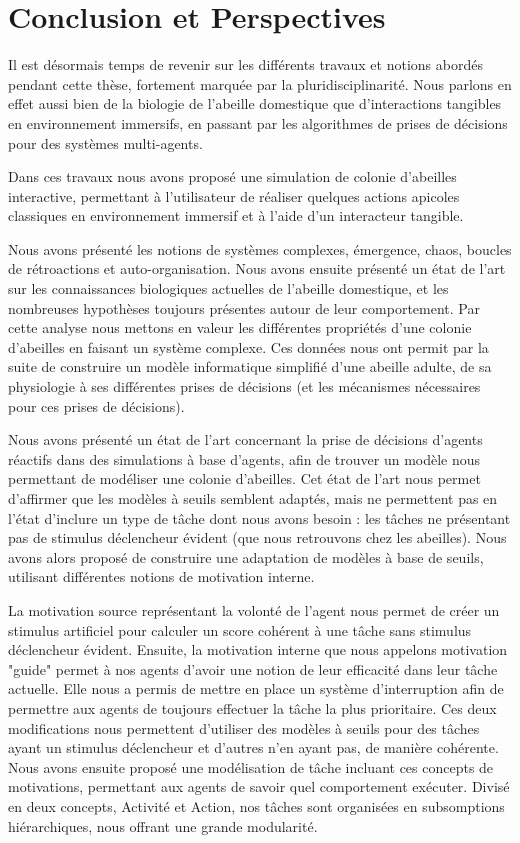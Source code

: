 \chapter*{Conclusion et Perspectives}

Il est désormais temps de revenir sur les différents travaux et notions abordés pendant cette thèse, fortement marquée par la pluridisciplinarité. Nous parlons en effet aussi bien de la biologie de l'abeille domestique que d'interactions tangibles en environnement immersifs, en passant par les algorithmes de prises de décisions pour des systèmes multi-agents.

Dans ces travaux nous avons proposé une simulation de colonie d'abeilles interactive, permettant à l'utilisateur de réaliser quelques actions apicoles classiques en environnement immersif et à l'aide d'un interacteur tangible.

Nous avons présenté les notions de systèmes complexes, émergence, chaos, boucles de rétroactions et auto-organisation. Nous avons ensuite présenté un état de l'art sur les connaissances biologiques actuelles de l'abeille domestique, et les nombreuses hypothèses toujours présentes autour de leur comportement. Par cette analyse nous mettons en valeur les différentes propriétés d'une colonie d'abeilles en faisant un système complexe. Ces données nous ont permit par la suite de construire un modèle informatique simplifié d'une abeille adulte, de sa physiologie à ses différentes prises de décisions (et les mécanismes nécessaires pour ces prises de décisions).

Nous avons présenté un état de l'art concernant la prise de décisions d'agents réactifs dans des simulations à base d'agents, afin de trouver un modèle nous permettant de modéliser une colonie d'abeilles. Cet état de l'art nous permet d'affirmer que les modèles à seuils semblent adaptés, mais ne permettent pas en l'état d'inclure un type de tâche dont nous avons besoin : les tâches ne présentant pas de stimulus déclencheur évident (que nous retrouvons chez les abeilles). Nous avons alors proposé de construire une adaptation de modèles à base de seuils, utilisant différentes notions de motivation interne.

La motivation source représentant la volonté de l'agent nous permet de créer un stimulus artificiel pour calculer un score cohérent à une tâche sans stimulus déclencheur évident. Ensuite, la motivation interne que nous appelons motivation "guide" permet à nos agents d'avoir une notion de leur efficacité dans leur tâche actuelle. Elle nous a permis de mettre en place un système d'interruption afin de permettre aux agents de toujours effectuer la tâche la plus prioritaire. Ces deux modifications nous permettent d'utiliser des modèles à seuils pour des tâches ayant un stimulus déclencheur et d'autres n'en ayant pas, de manière cohérente. Nous avons ensuite proposé une modélisation de tâche incluant ces concepts de motivations, permettant aux agents de savoir quel comportement exécuter. Divisé en deux concepts, Activité et Action, nos tâches sont organisées en subsomptions hiérarchiques, nous offrant une grande modularité.

